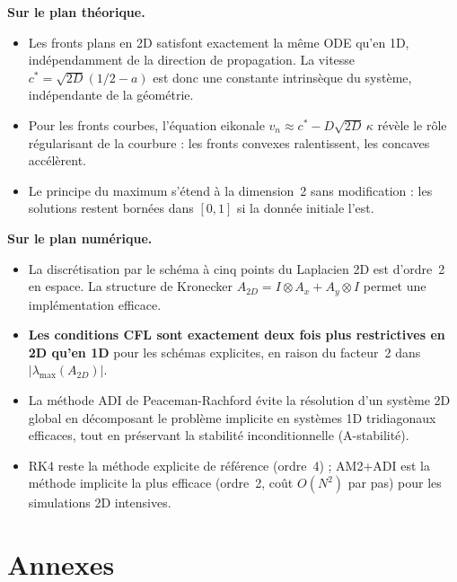 \documentclass[11pt,a4paper]{report}
\begin{document}
\medskip
\noindent\textbf{Sur le plan th\'eorique.}
\begin{itemize}[leftmargin=1.5em]
  \item Les fronts plans en 2D satisfont exactement la m\^eme ODE qu'en 1D, ind\'ependamment
        de la direction de propagation. La vitesse $c^*=\sqrt{2D}(1/2-a)$ est donc
        une constante intrins\`eque du syst\`eme, ind\'ependante de la g\'eom\'etrie.
  \item Pour les fronts courbes, l'\'equation eikonale $v_n\approx c^*-D\sqrt{2D}\,\kappa$
        r\'ev\`ele le r\^ole r\'egularisant de la courbure : les fronts convexes ralentissent,
        les concaves acc\'el\`erent.
  \item Le principe du maximum s'\'etend \`a la dimension~2 sans modification : les solutions
        restent born\'ees dans $[0,1]$ si la donn\'ee initiale l'est.
\end{itemize}

\medskip
\noindent\textbf{Sur le plan num\'erique.}
\begin{itemize}[leftmargin=1.5em]
  \item La discr\'etisation par le sch\'ema \`a cinq points du Laplacien 2D est d'ordre~2
        en espace. La structure de Kronecker $A_{2D}=I\otimes A_x + A_y\otimes I$ permet
        une impl\'ementation efficace.
  \item \textbf{Les conditions CFL sont exactement deux fois plus restrictives en 2D qu'en 1D}
        pour les sch\'emas explicites, en raison du facteur~2 dans $|\lambda_{\max}(A_{2D})|$.
  \item La m\'ethode ADI de Peaceman-Rachford \'evite la r\'esolution d'un syst\`eme 2D
        global en d\'ecomposant le probl\`eme implicite en syst\`emes 1D tridiagonaux
        efficaces, tout en pr\'eservant la stabilit\'e inconditionnelle (A-stabilit\'e).
  \item RK4 reste la m\'ethode explicite de r\'ef\'erence (ordre~4) ; AM2+ADI est la m\'ethode
        implicite la plus efficace (ordre~2, co\^ut $O(N^2)$ par pas) pour les simulations
        2D intensives.
\end{itemize}

\chapter*{Annexes}
\end{document}
